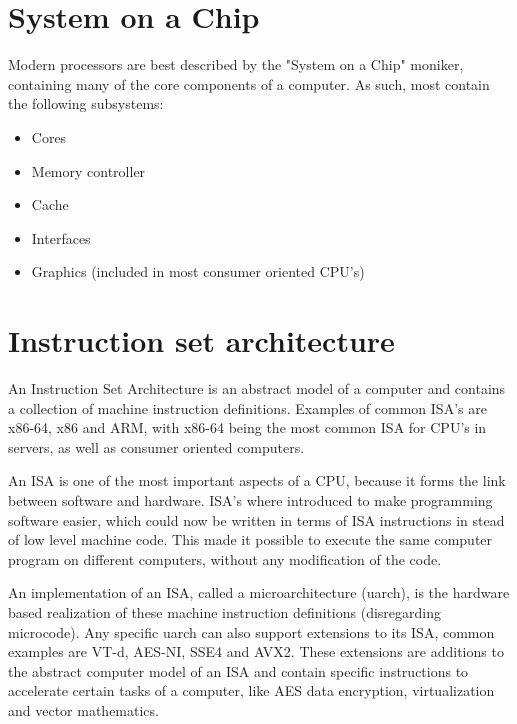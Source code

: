 \newpage

\section{System on a Chip}

\hspace{4mm}Modern processors are best described by the "System on a Chip"\autocite[]{wiki_cpu} moniker, containing many of the core components of a computer. As such, most contain the following subsystems:

\begin{itemize}
    \item Cores
    \item Memory controller
    \item Cache
    \item Interfaces
    \item Graphics (included in most consumer oriented CPU's)
\end{itemize}

\section{Instruction set architecture}

\hspace{4mm}An Instruction Set Architecture is an abstract model of a computer and contains a collection of machine instruction definitions\autocite[]{wiki_isa}. Examples of common ISA's are x86-64, x86 and ARM, with x86-64 being the most common ISA for CPU's in servers, as well as consumer oriented computers.\vspace{5mm}

An ISA is one of the most important aspects of a CPU, because it forms the link between software and hardware. ISA's where introduced to make programming software easier, which could now be written in terms of ISA instructions in stead of low level machine code\autocite[]{wiki_mc}. This made it possible to execute the same computer program on different computers, without any modification of the code.\vspace{5mm}

An implementation of an ISA, called a microarchitecture (uarch)\autocite[]{wiki_ua}, is the hardware based realization of these machine instruction definitions (disregarding microcode\autocite[]{wiki_uc}). Any specific uarch can also support extensions to its ISA, common examples are VT-d, AES-NI, SSE4 and AVX2. These extensions are additions to the abstract computer model of an ISA and contain specific instructions to accelerate certain tasks of a computer, like AES data encryption, virtualization and vector mathematics.\vspace{5mm}

